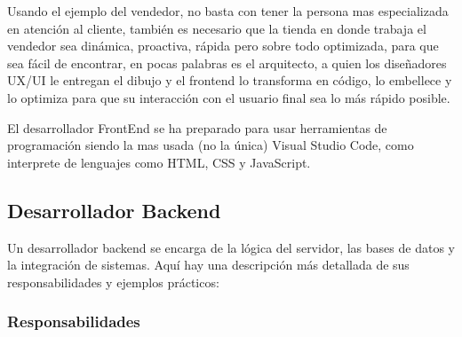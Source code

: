 \documentclass[
  letterpaper,
  DIV=11,
  numbers=noendperiod]{scrreprt}
\begin{document}
Usando el ejemplo del vendedor, no basta con tener la persona mas
especializada en atención al cliente, también es necesario que la tienda
en donde trabaja el vendedor sea dinámica, proactiva, rápida pero sobre
todo optimizada, para que sea fácil de encontrar, en pocas palabras es
el arquitecto, a quien los diseñadores UX/UI le entregan el dibujo y el
frontend lo transforma en código, lo embellece y lo optimiza para que su
interacción con el usuario final sea lo más rápido posible.

El desarrollador FrontEnd se ha preparado para usar herramientas de
programación siendo la mas usada (no la única) Visual Studio Code, como
interprete de lenguajes como HTML, CSS y JavaScript.

\subsection{\texorpdfstring{\textbf{Desarrollador
Backend}}{Desarrollador Backend}}\label{desarrollador-backend}

Un desarrollador backend se encarga de la lógica del servidor, las bases
de datos y la integración de sistemas. Aquí hay una descripción más
detallada de sus responsabilidades y ejemplos prácticos:

\subsubsection{\texorpdfstring{\textbf{Responsabilidades}}{Responsabilidades}}\label{responsabilidades-1}
\end{document}
